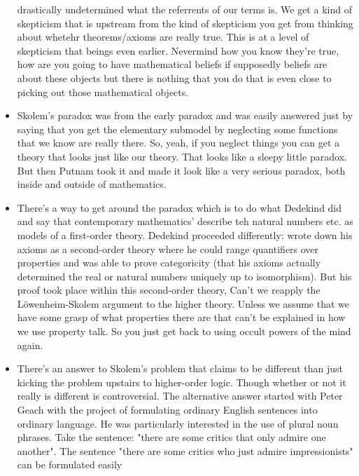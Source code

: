 \documentclass[12pt]{article}
\theoremstyle{definition}
\begin{document}
\begin{itemize}
        drastically undetermined what the referrents of our terms is. We get a
        kind of skepticism that is upstream from the kind of skepticism you get
        from thinking about whetehr theorems/axioms are really true.  This is
        at a level of skepticism that beings even earlier. Nevermind how you
        know they're true, how are you going to have mathematical beliefs if
        supposedly beliefs are about these objects but there is nothing that
        you do that is even close to picking out those mathematical objects.
    \item
        Skolem's paradox was from the early paradox and was easily answered
        just by saying that you get the elementary submodel by neglecting some
        functions that we know are really there. So, yeah, if you neglect
        things you can get a theory that looks just like our theory. That looks
        like a sleepy little paradox. But then Putnam took it and made it look
        like a very serious paradox, both inside and outside of mathematics.
    \item
        There's a way to get around the paradox which is to do what Dedekind
        did and say that contemporary mathematics' describe teh natural numbers
        etc. as models of a first-order theory. Dedekind proceeded differently:
        wrote down his axioms as a second-order theory where he could range
        quantifiers over properties and was able to prove categoricity (that
        his axioms actually determined the real or natural numbers uniquely up
        to isomorphism). But his proof took place within this second-order
        theory, Can't we reapply the L\"owenheim-Skolem argument to the higher
        theory. Unless we assume that we have some grasp of what properties
        there are that can't be explained in how we use property talk. So you
        just get back to using occult powers of the mind again. 
    \item
        There's an answer to Skolem's problem that claims to be different than
        just kicking the problem upstairs to higher-order logic. Though whether
        or not it really is different is controversial. The alternative answer
        started with Peter Geach with the project of formulating ordinary
        English sentences into ordinary language. He was particularly
        interested in the use of plural noun phrases. Take the sentence: "there
        are some critics that only admire one another". The sentence "there are
        some critics who just admire impressionists" can be formulated easily

\end{itemize}
\end{document}

